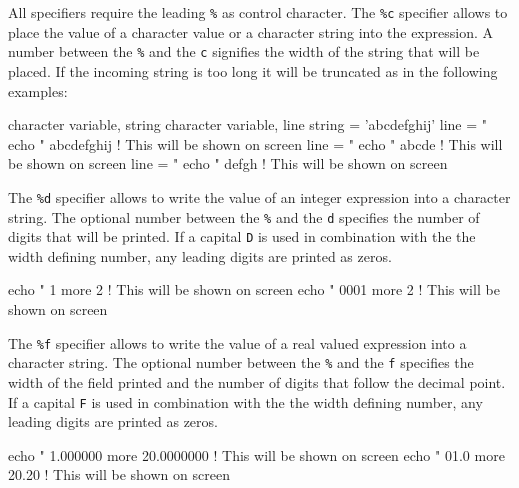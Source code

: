 All specifiers require the leading {\tt \%} as control character. 
The {\tt \%c} specifier allows to place the value of a character value or 
a character string into the expression. A number between the {\tt \%} and 
the {\tt c} signifies the width of the string that will be placed. If the 
incoming string is too long it will be truncated as in the following 
examples:
\begin{MacVerbatim}
  character variable, string
  character variable, line
  string = 'abcdefghij'
  line   = "%
  echo "%
  abcdefghij               ! This will be shown on screen
  line   = "%
  echo "%
  abcde                    ! This will be shown on screen
  line   = "%
  echo "%
  defgh                    ! This will be shown on screen
\end{MacVerbatim}

The {\tt \%d} specifier allows to write the value of an integer expression
into a character string. The optional number between the {\tt \%} and the 
{\tt d} specifies the number of digits that will be printed. If a 
capital {\tt D} is used in combination with the the width defining 
number, any leading digits are printed as zeros.

\begin{MacVerbatim}
  echo "%
  1 more 2                ! This will be shown on screen
  echo "%
  0001 more    2          ! This will be shown on screen
\end{MacVerbatim}

The {\tt \%f} specifier allows to write the value of a real valued expression
into a character string. The optional number between the {\tt \%} and the 
{\tt f} specifies the width of the field printed and the number of 
digits that follow the decimal point. If a  
capital {\tt F} is used in combination with the the width defining
number, any leading digits are printed as zeros.

\begin{MacVerbatim}
  echo "%
  1.000000 more 20.0000000 ! This will be shown on screen
  echo "%
  01.0 more   20.20        ! This will be shown on screen
\end{MacVerbatim}

